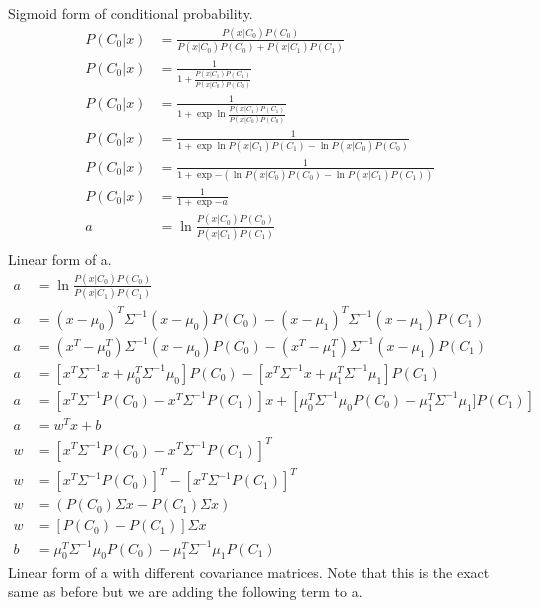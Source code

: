 \documentclass[newpage]{homework}
\begin{document}
\maketitle


\question
Sigmoid form of conditional probability.
\begin{align*}
    P(C_0|x)	&=	\frac{P(x|C_0)P(C_0)}{P(x|C_0)P(C_0)+P(x|C_1)P(C_1)}	\\
    P(C_0|x)	&=	\frac{1}{1+\frac{P(x|C_1)P(C_1)}{P(x|C_0)P(C_0)}}	\\
    P(C_0|x)	&=	\frac{1}{1+\exp{\ln \frac{P(x|C_1)P(C_1)}{P(x|C_0)P(C_0)}}}	\\
    P(C_0|x)	&=	\frac{1}{1+\exp{\ln P(x|C_1)P(C_1) - \ln P(x|C_0)P(C_0) }}	\\
    P(C_0|x)	&=  \frac{1}{1+\exp{-(\ln P(x|C_0)P(C_0) - \ln P(x|C_1)P(C_1))}}    \\
    P(C_0|x)	&=	\boxed{\frac{1}{1+\exp{-a}}}	\\
    a    &= \boxed{\ln \frac{P(x|C_0)P(C_0)}{P(x|C_1)P(C_1)} }  \\
\end{align*}
Linear form of a.
\begin{align*}
    a	&=	\ln \frac{P(x|C_0)P(C_0)}{P(x|C_1)P(C_1)}	\\
    a	&=	(x-\mu_0)^T \Sigma^{-1} (x-\mu_0) P(C_0) - (x-\mu_1)^T \Sigma^{-1} (x-\mu_1) P(C_1)   \\
    a	&=	(x^T-\mu_0^T) \Sigma^{-1} (x-\mu_0) P(C_0) - (x^T-\mu_1^T) \Sigma^{-1} (x-\mu_1) P(C_1)   \\
    a	&=	[x^T\Sigma^{-1}x + \mu_0^T \Sigma^{-1} \mu_0] P(C_0) - [x^T\Sigma^{-1}x + \mu_1^T \Sigma^{-1} \mu_1] P(C_1)   \\
    a	&=	\left[x^T\Sigma^{-1}P(C_0) - x^T\Sigma^{-1}P(C_1)\right] x + \left[\mu_0^T \Sigma^{-1} \mu_0 P(C_0) - \mu_1^T \Sigma^{-1} \mu_1] P(C_1) \right]    \\
    a   &=  \boxed{w^Tx+b}  \\
    w   &=  \left[x^T\Sigma^{-1}P(C_0) - x^T\Sigma^{-1}P(C_1)\right]^T \\
    w   &=  \left[x^T\Sigma^{-1}P(C_0)\right]^T - \left[x^T\Sigma^{-1}P(C_1)\right]^T \\
    w   &=  (P(C_0) \Sigma x - P(C_1) \Sigma x) \\
    w   &=  \boxed{[P(C_0) - P(C_1)]\Sigma x }\\
    b   &=  \boxed{\mu_0^T \Sigma^{-1} \mu_0 P(C_0) - \mu_1^T \Sigma^{-1} \mu_1 P(C_1)}
\end{align*}
Linear form of a with different covariance matrices. Note that this is the exact same as before but we are adding the following term to a.
\end{document}
